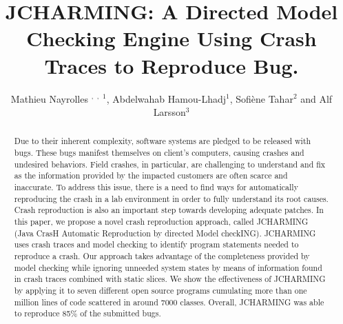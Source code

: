 \documentclass[times]{smrauth}
\begin{document}

\title{JCHARMING: A Directed Model Checking Engine Using Crash Traces to Reproduce Bug.}

\author{Mathieu Nayrolles \corrauth $^,$ \footnotemark[2] $^,$ $^1$, Abdelwahab Hamou-Lhadj$^1$, Sofi\`ene Tahar$^2$ and Alf Larsson$^3$}

\address{$^1$ SBA Research Lab, ECE, Concordia University, Montréal, Canada \\ 
$^2$ ECE Department, Concordia University, Montréal, Canada \\
$^3$ PLF System Management, Ericsson, R \& D, Stockholm, Sweden}


\begin{abstract}
Due to their inherent complexity, software systems
are pledged to be released with bugs. These bugs manifest
themselves on client's computers, causing crashes and undesired
behaviors. Field crashes, in particular, are challenging to
understand and fix as the information provided by the impacted
customers are often scarce and inaccurate. To address this issue,
there is a need to find ways for automatically reproducing the
crash in a lab environment in order to fully understand its root
causes. Crash reproduction is also an important step towards
developing adequate patches. In this paper, we propose a novel
crash reproduction approach, called JCHARMING (Java CrasH
Automatic Reproduction by directed Model checkING).
JCHARMING uses crash traces and model checking to identify
program statements needed to reproduce a crash. Our approach
takes advantage of the completeness provided by model checking
while ignoring unneeded system states by means of information
found in crash traces combined with static slices. We show the
effectiveness of JCHARMING by applying it to seven different
open source programs cumulating more than one million lines of
code scattered in around 7000 classes. Overall, JCHARMING
was able to reproduce 85\% of the submitted bugs.
\end{abstract}


\maketitle
\end{document}
